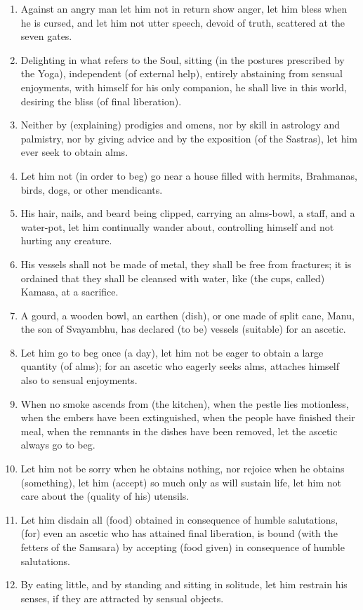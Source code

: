 \begin{enumerate}
\item Against an angry man let him not in return show anger, let him bless when he is cursed, and let him not utter speech, devoid of truth, scattered at the seven gates.
\item Delighting in what refers to the Soul, sitting (in the postures prescribed by the Yoga), independent (of external help), entirely abstaining from sensual enjoyments, with himself for his only companion, he shall live in this world, desiring the bliss (of final liberation).
\item Neither by (explaining) prodigies and omens, nor by skill in astrology and palmistry, nor by giving advice and by the exposition (of the Sastras), let him ever seek to obtain alms.
\item Let him not (in order to beg) go near a house filled with hermits, Brahmanas, birds, dogs, or other mendicants.
\item His hair, nails, and beard being clipped, carrying an alms-bowl, a staff, and a water-pot, let him continually wander about, controlling himself and not hurting any creature.
\item His vessels shall not be made of metal, they shall be free from fractures; it is ordained that they shall be cleansed with water, like (the cups, called) Kamasa, at a sacrifice.
\item A gourd, a wooden bowl, an earthen (dish), or one made of split cane, Manu, the son of Svayambhu, has declared (to be) vessels (suitable) for an ascetic.
\item Let him go to beg once (a day), let him not be eager to obtain a large quantity (of alms); for an ascetic who eagerly seeks alms, attaches himself also to sensual enjoyments.
\item When no smoke ascends from (the kitchen), when the pestle lies motionless, when the embers have been extinguished, when the people have finished their meal, when the remnants in the dishes have been removed, let the ascetic always go to beg.
\item Let him not be sorry when he obtains nothing, nor rejoice when he obtains (something), let him (accept) so much only as will sustain life, let him not care about the (quality of his) utensils.
\item Let him disdain all (food) obtained in consequence of humble salutations, (for) even an ascetic who has attained final liberation, is bound (with the fetters of the Samsara) by accepting (food given) in consequence of humble salutations.
\item By eating little, and by standing and sitting in solitude, let him restrain his senses, if they are attracted by sensual objects.

\end{enumerate}
